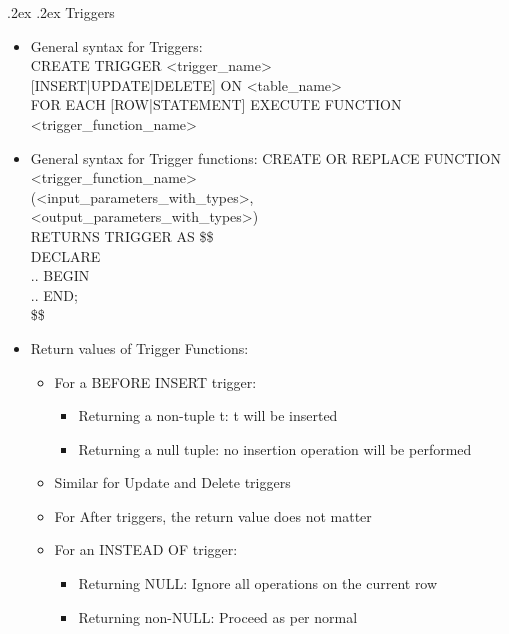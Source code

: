 \documentclass[10pt,landscape,a4paper]{scrartcl}
\makeatletter
\renewcommand{\section}{\@startsection{section}{1}{0mm}%
  {.2ex}%
  {.2ex}%
{\color{myblue}\sffamily\small\bfseries}}
\makeatother
\begin{document}
\begin{multicols*}{4}
  \section{Triggers}
    \begin{itemize}
      \item General syntax for Triggers: \\
      CREATE TRIGGER <trigger\_name> \\ 
      [AFTER|BEFORE|INSTEAD OF] [INSERT|UPDATE|DELETE] ON <table\_name> \\
      FOR EACH [ROW|STATEMENT] EXECUTE FUNCTION <trigger\_function\_name>\\
      \item General syntax for Trigger functions:
      CREATE OR REPLACE FUNCTION <trigger\_function\_name> \\
      (<input\_parameters\_with\_types>, \\ <output\_parameters\_with\_types>) \\
      RETURNS TRIGGER AS \$\$ \\
      DECLARE \\
      ..
      BEGIN \\
      ..
      END; \\
      \$\$
      \item Return values of Trigger Functions:
        \begin{itemize}
            \item For a BEFORE INSERT trigger:
            \begin{itemize}
                \item Returning a non-tuple t: t will be inserted
                \item Returning a null tuple: no insertion operation will be performed
            \end{itemize}
            \item Similar for Update and Delete triggers
            \item For After triggers, the return value does not matter
            \item For an INSTEAD OF trigger:
            \begin{itemize}
                \item Returning NULL: Ignore all operations on the current row
                \item Returning non-NULL: Proceed as per normal
            \end{itemize}
        \end{itemize}

\end{itemize}
\end{multicols*}
\end{document}
